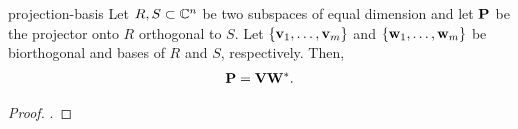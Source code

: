 \begin{Lemma}{projection-basis}
  Let $R,S\subset\mathbb C^n$ be two subspaces of equal dimension and let
  $\mathbf P$ be the projector onto $R$ orthogonal to $S$. Let
  $\{\mathbf v_1,\dots,\mathbf v_m\}$ and $\{\mathbf w_1,\dots,\mathbf w_m\}$ be biorthogonal
  and bases of $R$ and $S$, respectively. Then,
  \begin{gather}
    \mathbf P = \mathbf V\mathbf W^*.
  \end{gather}
\end{Lemma}

\begin{proof}
  \cite[Section 1.12.2]{Saad00}.
\end{proof}


